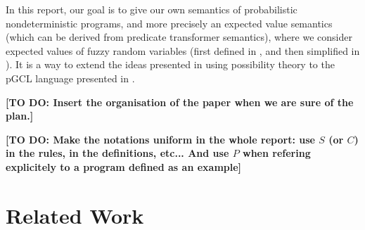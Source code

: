 \documentclass[a4paper,10pt]{llncs}
\newcommand\todo[1]{{\color{red}\textbf{[TO DO:  #1]}}}
\begin{document}
In this report, our goal is to give our own semantics of probabilistic nondeterministic programs, and more precisely an expected value semantics (which can be derived from predicate transformer semantics), where we consider expected values of fuzzy random variables (first defined in \cite{PuriRal86}, and then simplified in \cite{Shapiro09}). It is a way to extend the ideas presented in \cite{WuChen08,WuChen11,WuChen12} using possibility theory to the pGCL language presented in \cite{McIver05}.\bigskip

\todo{Insert the organisation of the paper when we are sure of the plan.}

\todo{Make the notations uniform in the whole report: use $S$ (or $C$) in the rules, in the definitions, etc... And use $P$ when refering explicitely to a program defined as an example}
\section{Related Work}
\label{sec:related}

    
\end{document}

